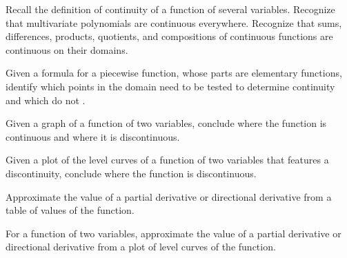 \documentclass[11pt, oneside]{article}
\newcounter{objective}
\begin{document}
	\begin{objectives}
		\item Recall the definition of continuity of a function of several variables. Recognize that multivariate polynomials are continuous everywhere. Recognize that sums, differences, products, quotients, and compositions of continuous functions are continuous on their domains.
		\item Given a formula for a piecewise function, whose parts are elementary functions, identify which points in the domain need to be tested to determine continuity and which do not
			.
		\item 
		\begin{subobjectives}
			\item Given a graph of a function of two variables, conclude where the function is continuous and where it is discontinuous.
			\item Given a plot of the level curves of a function of two variables that features a discontinuity, conclude where the function is discontinuous.
		\end{subobjectives}
	\end{objectives}

	\threshold[Der]{Derivatives}
	\begin{objectives}
		\item Approximate the value of a partial derivative or directional derivative from a table of values of the function.
		\item For a function of two variables, approximate the value of a partial derivative or directional derivative from a plot of level curves of the function.
	\end{objectives}
\end{document}
